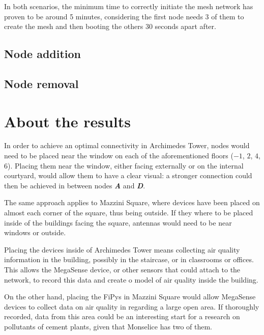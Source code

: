 			In both scenarios, the minimum time to correctly initiate the mesh network has proven to be around 5 minutes, considering the first node needs 3 of them to create the mesh and then booting the others 30 seconds apart after.
			
		\subsection{Node addition}\label{subsec:node_addition}
		

		\subsection{Node removal}
		
	
	\section{About the results}
		
		In order to achieve an optimal connectivity in Archimedes Tower, nodes would need to be placed near the window on each of the aforementioned floors ($-1$, $2$, $4$, $6$).
		Placing them near the window, either facing externally or on the internal courtyard, would allow them to have a clear visual: a stronger connection could then be achieved in between nodes \textbf{\textit{A}} and \textbf{\textit{D}}.
		
		The same approach applies to Mazzini Square, where devices have been placed on almost each corner of the square, thus being outside.
		If they where to be placed inside of the buildings facing the square, antennas would need to be near windows or outside.
		
		Placing the devices inside of Archimedes Tower means collecting air quality information in the building, possibly in the staircase, or in classrooms or offices.
		This allows the MegaSense device, or other sensors that could attach to the network, to record this data and create o model of air quality inside the building.
		
		On the other hand, placing the FiPys in Mazzini Square would allow MegaSense devices to collect data on air quality in regarding a large open area.
		If thoroughly recorded, data from this area could be an interesting start for a research on pollutants of 	cement plants, given that Monselice has two of them.
		

